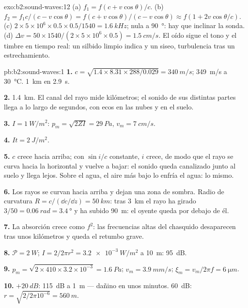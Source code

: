 \begin{solution}{exo:b2:sound-waves:12}
(a) $f_1 = f(c + v\cos\theta)/c$. (b) $f_2 = f_1c/(c - v\cos\theta) = f(c + v\cos\theta)
/(c - v\cos\theta) \approx f(1 + 2v\cos\theta/c)$. (c) $2 \times 5 \times 10^6 \times 0.5 \times 0.5/1540
= \qty{1.6}{kHz}$; nula a \qty{90}{\degree}: hay que inclinar la sonda. (d) $\Delta v = 50 \times 1540/
(2 \times 5 \times 10^6 \times 0.5) = \qty{1.5}{cm/s}$. El oído sigue el tono y el timbre en
tiempo real: un silbido limpio indica  y un siseo, turbulencia
tras un estrechamiento.
\end{solution}

\begin{solution}{pb:b2:sound-waves:1}
\textbf{1.} $c = \sqrt{1.4 \times 8.31 \times 288/0.029} = \qty{340}{m/s}$; \qty{349}{m/s}
a \qty{30}{\degreeCelsius}. \qty{1}{km} en \qty{2.9}{s}.

\textbf{2.} \qty{1.4}{km}. El canal del rayo mide kilómetros; el sonido de
sus distintas partes llega a lo largo de segundos, con ecos en las nubes y
en el suelo.

\textbf{3.} $I = \qty{1}{W/m^2}$: $p_m = \sqrt{2ZI} = \qty{29}{Pa}$, $v_m = \qty{7}{cm/s}$.

\textbf{4.} $It = \qty{2}{J/m^2}$.

\textbf{5.} $c$ crece hacia arriba; con $\sin i/c$ constante, $i$ crece, de
modo que el rayo se curva hacia la horizontal y vuelve a bajar: el sonido
queda canalizado junto al suelo y llega lejos. Sobre el agua, el aire más
bajo lo enfría el agua: lo mismo.

\textbf{6.} Los rayos se curvan hacia arriba y dejan una zona de sombra.
Radio de curvatura $R = c/(\dd c/\dd z) = \qty{50}{km}$: tras \qty{3}{km} el
rayo ha girado $3/50 = \qty{0.06}{rad} = \qty{3.4}{\degree}$ y ha subido
\qty{90}{m}: el oyente queda por debajo de él.

\textbf{7.} La absorción crece como $f^2$: las frecuencias altas del
chasquido desaparecen tras unos kilómetros y queda el retumbo grave.

\textbf{8.} $\mathcal P = \qty{2}{W}$; $I = 2/2\pi r^2 = \qty{3.2e-3}{W/m^2}$ a \qty{10}{m}:
\qty{95}{dB}.

\textbf{9.} $p_m = \sqrt{2 \times 410 \times 3.2 \times 10^{-3}} = \qty{1.6}{Pa}$; $v_m = \qty{3.9}{mm/s}$;
$\xi_m = v_m/2\pi f = \qty{6}{\micro m}$.

\textbf{10.} $+\qty{20}{dB}$: \qty{115}{dB} a \qty{1}{m} --- dañino en unos
minutos. \qty{60}{dB}: $r = \sqrt{2/2\pi10^{-6}} = \qty{560}{m}$.


\end{solution}
